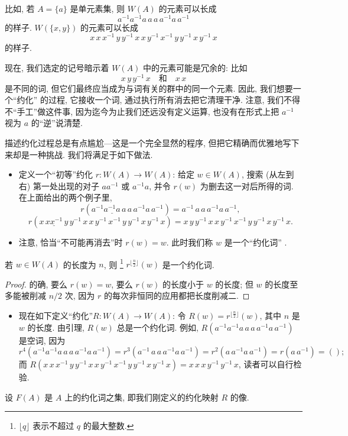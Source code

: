 比如, 若 $A = \{a\}$ 是单元素集, 则 $W(A)$ 的元素可以长成
\[
a^{-1} a^{-1} a\, a\, a\, a^{-1} a\, a^{-1}
\]
的样子. $W(\{x, y\})$ 的元素可以长成
\[
x\, x\, x^{-1}\, y\, y^{-1}\, x\, x\, y^{-1}\, x^{-1}\, y\, y^{-1}\, x\, y^{-1}\, x
\]
的样子.

现在, 我们选定的记号暗示着 $W(A)$ 中的元素可能是冗余的: 比如
\[
x\, y\, y^{-1}\, x \quad \text{和} \quad x\, x
\]
是不同的词, 但它们最终应当成为与词有关的群中的同一个元素. 因此, 我们想要一个``约化''%
的过程, 它接收一个词, 通过执行所有消去把它清理干净. 注意, 我们不得不``手工''做这件事, 因为迄今为止我们还远没有定义运算, 也没有在形式上把 $a^{-1}$ 视为 $a$ 的``逆''说清楚.

描述约化过程总是有点尴尬---这是一个完全显然的程序, 但把它精确而优雅地写下来却是一种挑战. 我们将满足于如下做法.
\begin{itemize}
	\item 定义一个``初等''约化 $r : W(A) \to W(A)$: 给定 $w \in W(A)$, 搜索 (从左到右) 第一处出现的对子 $aa^{-1}$ 或 $a^{-1}a$, 并令 $r(w)$ 为删去这一对后所得的词. 在上面给出的两个例子里,
	\[
	r(a^{-1}\underline{a^{-1}a}\,a\,a\,a^{-1}a\,a^{-1}) = a^{-1}\,a\,a\,a^{-1}a\,a^{-1},
	\]
	\[
	r(x\,\underline{x x^{-1}}\,y\,y^{-1}\,x\,x\,y^{-1}\,x^{-1}\,y\,y^{-1}\,x\,y^{-1}\,x) = x\,y\,y^{-1}\,x\,x\,y^{-1}\,x^{-1}\,y\,y^{-1}\,x\,y^{-1}\,x.
	\]

	\item 注意, 恰当``不可能再消去''时 $r(w) = w$. 此时我们称 $w$ 是一个``约化词''%
.
\end{itemize}

\begin{lemma}
\label{lem:reduction}
若 $w \in W(A)$ 的长度为 $n$, 则%
\footnote{$\lfloor q \rfloor$ 表示不超过 $q$ 的最大整数.}%
$r^{\lfloor \frac{n}{2} \rfloor}(w)$ 是一个约化词.
\end{lemma}

\begin{proof}
的确, 要么 $r(w) = w$, 要么 $r(w)$ 的长度小于 $w$ 的长度; 但 $w$ 的长度至多能被削减 $n/2$ 次, 因为 $r$ 的每次非恒同的应用都把长度削减二.
\end{proof}

\begin{itemize}
	\item 现在如下定义``约化''$R : W(A) \to W(A)$: 令 $R(w) = r^{\lfloor \frac{n}{2} \rfloor}(w)$, 其中 $n$ 是 $w$ 的长度. 由引理, $R(w)$ 总是一个约化词. 例如, $R(a^{-1}a^{-1}a\,a\,a\,a^{-1}a\,a^{-1})$ 是空词, 因为
	\[
	r^4(a^{-1}a^{-1}a\,a\,a\,a^{-1}a\,a^{-1}) = r^3(a^{-1}\,a\,a\,a^{-1}a\,a^{-1}) = r^2(a\,a^{-1}a\,a^{-1}) = r(a\,a^{-1}) = ();
	\]
	而 $R(x\,x\,x^{-1}\,y\,y^{-1}\,x\,x\,y^{-1}\,x^{-1}\,y\,y^{-1}\,x\,y^{-1}\,x) = x\,x\,x\,y^{-1}\,y^{-1}\,x$, 读者可以自行检验.
\end{itemize}
设 $F(A)$ 是 $A$ 上的约化词之集, 即我们刚定义的约化映射 $R$ 的像.

